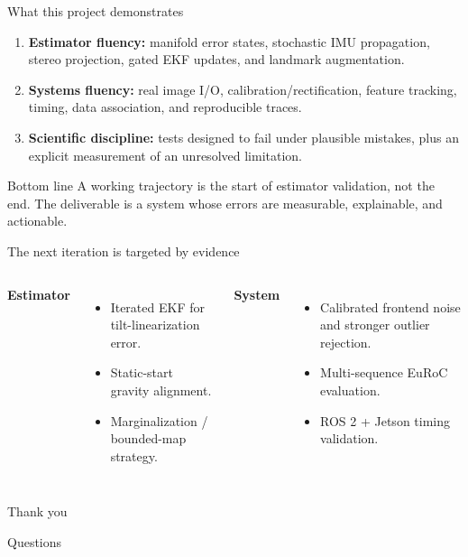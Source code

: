 \documentclass[10pt,aspectratio=169]{beamer}
\begin{document}
\begin{frame}{What this project demonstrates}
  \begin{enumerate}
    \item \textbf{Estimator fluency:} manifold error states, stochastic IMU propagation, stereo projection, gated EKF updates, and landmark augmentation.
    \item \textbf{Systems fluency:} real image I/O, calibration/rectification, feature tracking, timing, data association, and reproducible traces.
    \item \textbf{Scientific discipline:} tests designed to fail under plausible mistakes, plus an explicit measurement of an unresolved limitation.
  \end{enumerate}
  \vspace{0.5em}
  \begin{alertblock}{Bottom line}
    A working trajectory is the start of estimator validation, not the end. The deliverable is a system whose errors are measurable, explainable, and actionable.
  \end{alertblock}
\end{frame}

\begin{frame}{The next iteration is targeted by evidence}
  \begin{columns}[T]
    \textbf{Estimator}
    \begin{itemize}
      \item Iterated EKF for tilt-linearization error.
      \item Static-start gravity alignment.
      \item Marginalization / bounded-map strategy.
    \end{itemize}
    \textbf{System}
    \begin{itemize}
      \item Calibrated frontend noise and stronger outlier rejection.
      \item Multi-sequence EuRoC evaluation.
      \item ROS 2 + Jetson timing validation.
    \end{itemize}
  \end{columns}
\end{frame}

\begin{frame}
  \centering
  \vfill
  {\color{navy}\Huge Thank you}
  \vspace{0.5em}

  \Large Questions
  \vfill
\end{frame}
\end{document}
